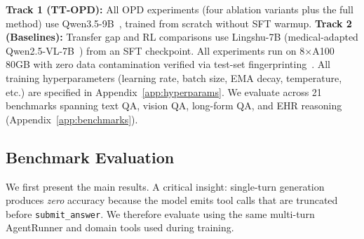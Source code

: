 \documentclass{article}
\begin{document}
\textbf{Track 1 (TT-OPD):} All OPD experiments (four ablation variants plus the full method) use Qwen3.5-9B~\citep{yang2024qwen25}, trained from scratch without SFT warmup. \textbf{Track 2 (Baselines):} Transfer gap and RL comparisons use Lingshu-7B (medical-adapted Qwen2.5-VL-7B~\citep{yang2024qwen25}) from an SFT checkpoint. All experiments run on 8$\times$A100 80GB with zero data contamination verified via test-set fingerprinting~\citep{yang2023rethinking}. All training hyperparameters (learning rate, batch size, EMA decay, temperature, etc.) are specified in Appendix~\ref{app:hyperparams}. We evaluate across 21 benchmarks spanning text QA, vision QA, long-form QA, and EHR reasoning (Appendix~\ref{app:benchmarks}).


\subsection{Benchmark Evaluation}
\label{sec:benchmark_multiturn}

We first present the main results. A critical insight: single-turn generation produces \emph{zero} accuracy because the model emits tool calls that are truncated before \texttt{submit\_answer}. We therefore evaluate using the same multi-turn AgentRunner and domain tools used during training.
\end{document}
